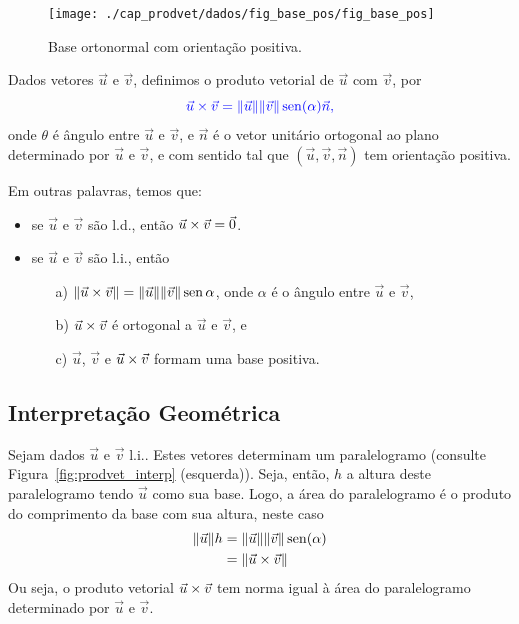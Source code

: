 \begin{figure}[H]
  \centering
  \texttt{[image: ./cap\_prodvet/dados/fig\_base\_pos/fig\_base\_pos]}
  \caption{Base ortonormal com orientação positiva.}
  \label{fig:base_pos}
\end{figure}

Dados vetores $\vec{u}$ e $\vec{v}$, definimos o produto vetorial de $\vec{u}$ com $\vec{v}$, por
\begin{equation}\color{blue}\vec{u}\times\vec{v} = \|\vec{u}\|\|\vec{v}\|\operatorname{sen}(\alpha)\vec{n},
\end{equation}
onde $\theta$ é ângulo entre $\vec{u}$ e $\vec{v}$, e $\vec{n}$ é o vetor unitário ortogonal ao plano determinado por $\vec{u}$ e $\vec{v}$, e com sentido tal que $(\vec{u}, \vec{v}, \vec{n})$ tem orientação positiva.

Em outras palavras, temos que:
\begin{itemize}
\item se $\vec{u}$ e $\vec{v}$ são l.d., então $\vec{u}\times\vec{v} = \vec{0}$.
\item se $\vec{u}$ e $\vec{v}$ são l.i., então
  \begin{itemize}
  \item[a)] $\|\vec{u}\times\vec{v}\| = \|\vec{u}\|\|\vec{v}\|\operatorname{sen}\alpha$, onde $\alpha$ é o ângulo entre $\vec{u}$ e $\vec{v}$,
  \item[b)] $\vec{u}\times\vec{v}$ é ortogonal a $\vec{u}$ e $\vec{v}$, e
  \item[c)] $\vec{u}$, $\vec{v}$ e $\vec{u}\times\vec{v}$ formam uma base positiva.
  \end{itemize}
\end{itemize}

\subsection{Interpretação Geométrica}

Sejam dados $\vec{u}$ e $\vec{v}$ l.i.. Estes vetores determinam um paralelogramo (consulte Figura~\ref{fig:prodvet_interp} (esquerda)). Seja, então, $h$ a altura deste paralelogramo tendo $\vec{u}$ como sua base. Logo, a área do paralelogramo é o produto do comprimento da base com sua altura, neste caso
\begin{align}
  \|\vec{u}\|h &= \|\vec{u}\|\|\vec{v}\|\operatorname{sen}(\alpha)\\
               &= \|\vec{u}\times\vec{v}\|
\end{align}
Ou seja, o produto vetorial $\vec{u}\times\vec{v}$ tem norma igual à área do paralelogramo determinado por $\vec{u}$ e $\vec{v}$.

